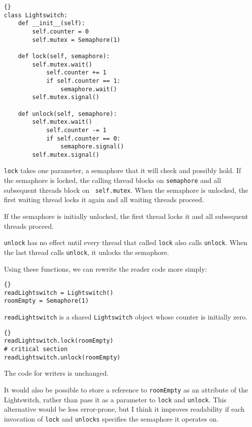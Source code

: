 \documentclass{book}
\begin{document}
\begin{lstlisting}[title={Lightswitch definition}]{}
class Lightswitch:
    def __init__(self):
        self.counter = 0
        self.mutex = Semaphore(1)

    def lock(self, semaphore):
        self.mutex.wait()
            self.counter += 1
            if self.counter == 1:
                semaphore.wait()
        self.mutex.signal()

    def unlock(self, semaphore):
        self.mutex.wait()
            self.counter -= 1
            if self.counter == 0:
                semaphore.signal()
        self.mutex.signal()
\end{lstlisting}

{\tt lock} takes one parameter, a semaphore that it will check and
possibly hold.  If the semaphore is locked, the calling thread blocks
on {\tt semaphore} and all subsequent threads block on {\tt
self.mutex}.  When the semaphore is unlocked, the first waiting thread
locks it again and all waiting threads proceed.

If the semaphore is initially unlocked, the first thread locks it
and all subsequent threads proceed.

{\tt unlock} has no effect until every thread that called {\tt lock}
also calls {\tt unlock}.  When the last thread calls {\tt unlock}, it
unlocks the semaphore.

\newpage
Using these functions, we can rewrite the reader code
more simply:

\begin{lstlisting}[title={Readers-writers initialization}]{}
readLightswitch = Lightswitch()
roomEmpty = Semaphore(1)
\end{lstlisting}

{\tt readLightswitch} is a shared {\tt Lightswitch} object whose counter
is initially zero.

\begin{lstlisting}[title={Readers-writers solution (reader)}]{}
readLightswitch.lock(roomEmpty)
# critical section
readLightswitch.unlock(roomEmpty)
\end{lstlisting}

The code for writers is unchanged.

It would also be possible to store a reference to {\tt roomEmpty}
as an attribute of the Lightswitch, rather than pass it as a parameter
to {\tt lock} and {\tt unlock}.  This alternative would be less
error-prone, but I think it improves readability if each invocation
of {\tt lock} and {\tt unlocks} specifies the semaphore it operates on.
\end{document}
